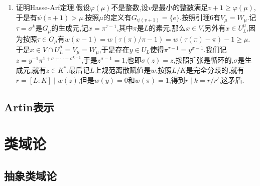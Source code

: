 \begin{enumerate}
\begin{proof}
    	我们先证明$V_m=V_{m+1}W_m$.如果$\varphi(m)$是整数,那么$\varphi(m)=n+1$,于是$\psi(n+1)=m$,那么引理3说明$V_m=V_{m+1}W_m$.如果$\varphi(m)$不是整数,设整数$n$满足$n<\varphi(m)<n+1$,引理5说明$V_m$和$W_m$在$U_L^m/U_L^{m+1}$中的像都是整个$U_L^m/U_L^{m+1}$,于是$U_L^{m+1}V_m=U_L^{m+1}W_m$,于是$V_m\subseteq W_mU_L^{m+1}$,于是$V_m\subseteq W_m(U_L^{m+1}\cap V)\subseteq W_mV_{m+1}$.于是有$V_m=V_{m+1}W_m$.
    	
    	\qquad
    	
    	接下来条件$n+1\ge\varphi(m)$可推出$\psi(n+2)\ge\psi(n+1)+1\ge m+1$,并且$G_{\psi(n+2)}=\{e\}$,所以得到$V_{m+1}=V_{m+2}W_{m+1}$,于是$V_m=V_{m+2}W_m$,继续归纳下去有$V_m=V_{m+k}W_m,\forall k$成立.但是引理2得到$k$足够大时$V_{m+k}=W_{m+k}\subseteq W_m$,所以得到$V_m\subseteq W_m$,也即$V_m=W_m$.
    \end{proof}
    \item 证明Hasse-Arf定理.假设$\varphi(\mu)$不是整数,设$v$是最小的整数满足$v+1\ge\varphi(\mu)$,于是有$\psi(v+1)>\mu$.按照$\mu$的定义有$G_{\psi(v+1)}=\{e\}$.按照引理6有$V_{\mu}=W_{\mu}$.记$\tau=\sigma^k$是$G_{\mu}$的生成元,记$x=\pi^{\tau-1}$,其中$\pi$是$L$的素元,那么$x\in V$,另外有$x\in U_L^{\mu}$,因为按照$\tau\in G_{\mu}$有$w(x-1)=w(\tau(\pi)/\pi-1)=w(\tau(\pi)-\pi)-1\ge\mu$.于是$x\in V\cap U_L^{\mu}=V_{\mu}=W_{\mu}$,于是存在$y\in U_L$使得$\pi^{\tau-1}=y^{\sigma-1}$.我们记$z=y^{-1}\pi^{1+\sigma+\cdots+\sigma^{k-1}}$,于是$z^{\sigma-1}=1$,也即$\sigma(z)=z$,按照扩张是循环的,$\sigma$是生成元,就有$z\in K^*$.最后记$L$上规范离散赋值是$w$,按照$L/K$是完全分歧的,就有$r=[L:K]\mid w(z)$,但是$w(y)=0$和$w(\pi)=1$,得到$r\mid k=r/r'$,这矛盾.
\end{enumerate}








\newpage
\subsection{Artin表示}












\newpage
\section{类域论}
\subsection{抽象类域论}

